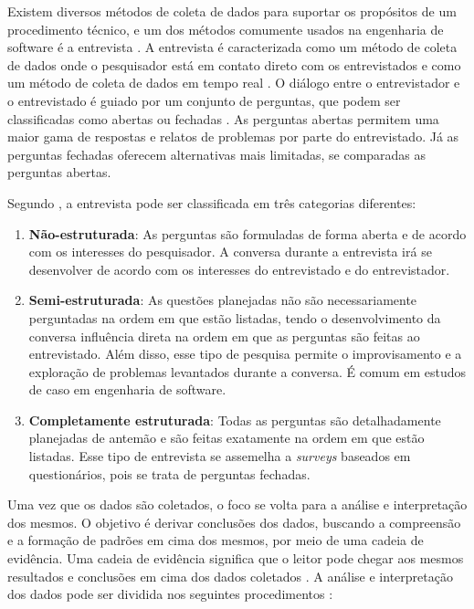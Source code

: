 Existem diversos métodos de coleta de dados para suportar os propósitos de um procedimento técnico, e um dos métodos comumente usados na engenharia de software é a entrevista \cite{caseStudySE}. A entrevista é caracterizada como um método de coleta de dados onde o pesquisador está em contato direto com os entrevistados e como um método de coleta de dados em tempo real \cite{caseStudySE}. O diálogo entre o entrevistador e o entrevistado é guiado por um conjunto de perguntas, que podem ser classificadas como abertas ou fechadas \cite{caseStudySE}. As perguntas abertas permitem uma maior gama de respostas e relatos de problemas por parte do entrevistado. Já as perguntas fechadas oferecem alternativas mais limitadas, se comparadas as perguntas abertas.

Segundo , a entrevista pode ser classificada em três categorias diferentes:
\begin{enumerate}
	\item \textbf{Não-estruturada}: As perguntas são formuladas de forma aberta e de acordo com os interesses do pesquisador. A conversa durante a entrevista irá se desenvolver de acordo com os interesses do entrevistado e do entrevistador.
	\item \textbf{Semi-estruturada}: As questões planejadas não são necessariamente perguntadas na ordem em que estão listadas, tendo o desenvolvimento da conversa influência direta na ordem em que as perguntas são feitas ao entrevistado. Além disso, esse tipo de pesquisa permite o improvisamento e a exploração de problemas levantados durante a conversa. É comum em estudos de caso em engenharia de software.
	\item \textbf{Completamente estruturada}: Todas as perguntas são detalhadamente planejadas de antemão e são feitas exatamente na ordem em que estão listadas. Esse tipo de entrevista se assemelha a \textit{surveys} baseados em questionários, pois se trata de perguntas fechadas.
\end{enumerate}

Uma vez que os dados são coletados, o foco se volta para a análise e interpretação dos mesmos. O objetivo é derivar conclusões dos dados, buscando a compreensão e a formação de padrões em cima dos mesmos, por meio de uma cadeia de evidência. Uma cadeia de evidência significa que o leitor pode chegar aos mesmos resultados e conclusões em cima dos dados coletados \cite{caseStudySE}. A análise e interpretação dos dados pode ser dividida nos seguintes procedimentos \cite{caseStudySE}:

